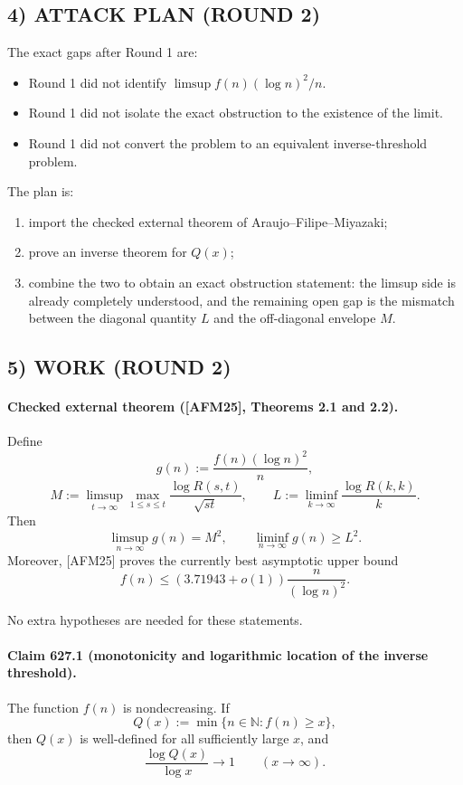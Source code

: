 \subsection*{4) ATTACK PLAN (ROUND 2)}

The exact gaps after Round 1 are:

\begin{itemize}
\item Round 1 did not identify \(\limsup f(n)(\log n)^2/n\).
\item Round 1 did not isolate the exact obstruction to the existence of the limit.
\item Round 1 did not convert the problem to an equivalent inverse-threshold problem.
\end{itemize}

The plan is:

\begin{enumerate}
\item import the checked external theorem of Araujo--Filipe--Miyazaki;
\item prove an inverse theorem for \(Q(x)\);
\item combine the two to obtain an exact obstruction statement:
the limsup side is already completely understood, and the remaining open gap is the mismatch between the diagonal quantity \(L\) and the off-diagonal envelope \(M\).
\end{enumerate}

\subsection*{5) WORK (ROUND 2)}

\paragraph{Checked external theorem ([AFM25], Theorems 2.1 and 2.2).}
Define
\[
g(n):=\frac{f(n)(\log n)^2}{n},
\]
\[
M:=\limsup_{t\to\infty}\max_{1\le s\le t}\frac{\log R(s,t)}{\sqrt{st}},
\qquad
L:=\liminf_{k\to\infty}\frac{\log R(k,k)}{k}.
\]
Then
\[
\limsup_{n\to\infty} g(n)=M^2,
\qquad
\liminf_{n\to\infty} g(n)\ge L^2.
\]
Moreover, [AFM25] proves the currently best asymptotic upper bound
\[
f(n)\le (3.71943+o(1))\frac{n}{(\log n)^2}.
\]

No extra hypotheses are needed for these statements.

\paragraph{Claim 627.1 (monotonicity and logarithmic location of the inverse threshold).}
The function \(f(n)\) is nondecreasing. If
\[
Q(x):=\min\{n\in\mathbb N:f(n)\ge x\},
\]
then \(Q(x)\) is well-defined for all sufficiently large \(x\), and
\[
\frac{\log Q(x)}{\log x}\to 1
\qquad (x\to\infty).
\]

